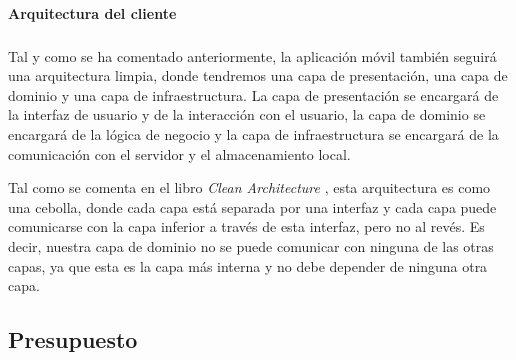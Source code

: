 \paragraph{Arquitectura del cliente}
\subparagraph{}
Tal y como se ha comentado anteriormente, la aplicación móvil también seguirá una arquitectura limpia, donde tendremos una capa de presentación, una capa de dominio y una capa de infraestructura.
La capa de presentación se encargará de la interfaz de usuario y de la interacción con el usuario, la capa de dominio se encargará de la lógica de negocio y la capa de infraestructura se encargará de la comunicación con el servidor y el almacenamiento local.

Tal como se comenta en el libro \textit{Clean Architecture} \parencite{uncle-bob-clean-architecture}, esta arquitectura es como una cebolla, donde cada capa está separada por una interfaz y cada capa puede comunicarse con la capa inferior a través de esta interfaz, pero no al revés.
Es decir, nuestra capa de dominio no se puede comunicar con ninguna de las otras capas, ya que esta es la capa más interna y no debe depender de ninguna otra capa.

\subsection{Presupuesto}

